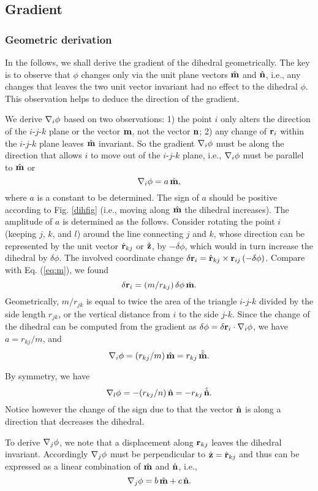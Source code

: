 \documentclass{article}
\begin{document}
\subsection{Gradient}

\subsubsection{Geometric derivation}

In the follows, we shall derive the gradient of the dihedral geometrically.
%
The key is to observe that $\phi$ changes only via the unit plane vectors $\hat{\mathbf{m}}$ and $\hat{\mathbf{n}}$,
i.e., any changes that leaves the two unit vector invariant had no effect to 
the dihedral $\phi$.
This observation helps to deduce the direction of the gradient.

We derive $\nabla_i \phi$ based on two observations: 
1) the point $i$ only alters the direction of the $i$-$j$-$k$ plane or the vector $\mathbf{m}$,
    not the vector $\mathbf{n}$;
2) any change of $\mathbf{r}_i$ within the $i$-$j$-$k$ plane leaves $\hat{\mathbf{m}}$ invariant.
    So the gradient $\nabla_i \phi$ must be along the direction that 
    allows $i$ to move out of the $i$-$j$-$k$ plane,
i.e., $\nabla_i \phi$ must be parallel to $\hat{\mathbf{m}}$ or 
\[
\nabla_i \phi  = a \, \hat{\mathbf{m}},
\]
where $a$ is a constant to be determined.
%
The sign of $a$ should be positive according to Fig. \ref{dihfig} (i.e., moving along $\hat{\mathbf{m}}$ the dihedral increases).
%
The amplitude of $a$ is determined as the follows.
Consider rotating the point $i$ (keeping $j$, $k$, and $l$) around 
the line connecting $j$ and $k$, whose direction can be represented by the unit vector $\hat{\mathbf{r}}_{kj}$ or $\hat{\mathbf{z}}$,
by $-\delta \phi$, which would in turn increase the dihedral by $\delta \phi$.
The involved coordinate change
$\delta \mathbf{r}_i = \hat{\mathbf{r}}_{kj} \times \mathbf{r}_{ij} \, (-\delta \phi)$.
Compare with Eq. (\ref{eq:m}), we found 
\[
 \delta \mathbf{r}_i =  (m/r_{kj}) \, \delta \phi \, \hat{\mathbf{m}}.
\]
Geometrically, $m/r_{jk}$ is equal to twice the area of the triangle $i$-$j$-$k$
 divided by the side length $r_{jk}$,
or the vertical distance from $i$ to the side $j$-$k$.
%
%
Since the change of the dihedral can be computed from the gradient as 
$\delta \phi = \delta \mathbf{r}_i \cdot \nabla_i \phi $, we have 
$a = r_{kj}/m$, and 
\[
\nabla_i \phi = (r_{kj}/m) \, \hat{\mathbf{m}} = r_{kj} \, \hat{\hat{\mathbf{m}}}.
\]

By symmetry, we have
\[
\nabla_l \phi = -(r_{kj}/n) \, \hat{\mathbf{n}} = -r_{kj} \, \hat{\hat{\mathbf{n}}}.
\]
Notice however the change of the sign due to that 
the vector $\hat{\mathbf{n}}$ is along a direction that decreases the dihedral.

To derive $\nabla_j \phi$, we note that a displacement along $\mathbf{r}_{kj}$ 
leaves the dihedral invariant. 
Accordingly $\nabla_j \phi$ must be perpendicular to $\hat{\mathbf{z}} = \hat{\mathbf{r}}_{kj}$ 
and thus can be expressed as a linear combination of $\hat{\mathbf{m}}$ and $\hat{\mathbf{n}}$, i.e.,
\[
\nabla_j \phi = b \, \hat{\mathbf{m}} + c \, \hat{\mathbf{n}}.
\]
\end{document}

